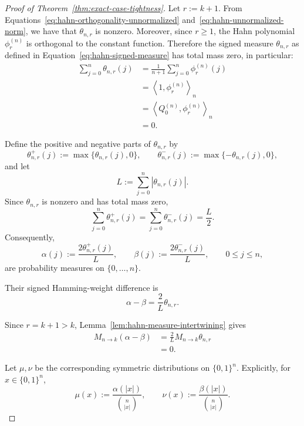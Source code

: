 \documentclass[manuscript,nonacm]{acmart}
\begin{document}
\begin{proof}[Proof of Theorem~\ref{thm:exact-case-tightness}]
Let $r:=k+1$. From Equations~\ref{eq:hahn-orthogonality-unnormalized} and~\ref{eq:hahn-unnormalized-norm}, we have that $\theta_{n,r}$ is nonzero. Moreover, since \(r\ge 1\), the Hahn polynomial \(\phi_r^{(n)}\) is orthogonal to
the constant function. Therefore the signed measure
\(\theta_{n,r}\) as defined in Equation~\ref{eq:hahn-signed-measure} has total mass zero, in particular:
\[
\begin{aligned}
    \sum_{j=0}^n \theta_{n,r}(j)
    &=
    \frac{1}{n+1}
    \sum_{j=0}^n \phi_r^{(n)}(j) \\
    &=
    \left\langle
        1,\phi_r^{(n)}
    \right\rangle_n \\
    &=
    \left\langle
        Q_0^{(n)},\phi_r^{(n)}
    \right\rangle_n \\
    &=0.
\end{aligned}
\]

Define the positive and negative parts of \(\theta_{n,r}\) by
\[
    \theta_{n,r}^{+}(j)
    :=
    \max\{\theta_{n,r}(j),0\},
    \qquad
    \theta_{n,r}^{-}(j)
    :=
    \max\{-\theta_{n,r}(j),0\},
\]
and let
\[
    L
    :=
    \sum_{j=0}^n
    |\theta_{n,r}(j)|.
\]
Since \(\theta_{n,r}\) is nonzero and has total mass zero,
\[
    \sum_{j=0}^n \theta_{n,r}^{+}(j)
    =
    \sum_{j=0}^n \theta_{n,r}^{-}(j)
    =
    \frac{L}{2}.
\]
Consequently,
\[
    \alpha(j)
    :=
    \frac{2\theta_{n,r}^{+}(j)}{L},
    \qquad
    \beta(j)
    :=
    \frac{2\theta_{n,r}^{-}(j)}{L},
    \qquad 0\le j\le n,
\]
are probability measures on \(\{0,\dots,n\}\).


Their signed Hamming-weight difference is
\[
    \alpha-\beta
    =
    \frac{2}{L}\theta_{n,r}.
\]

Since \(r=k+1>k\), Lemma~\ref{lem:hahn-measure-intertwining} gives
\begin{equation}
\label{eq:margAB}
    \begin{aligned}
    M_{n\to k}(\alpha-\beta)
    &=
    \frac{2}{L}
    M_{n\to k}\theta_{n,r} \\
    &=0.
\end{aligned}
\end{equation}


Let \(\mu,\nu\) be the corresponding symmetric distributions on
\(\{0,1\}^n\). Explicitly, for \(x\in\{0,1\}^n\),
\[
    \mu(x)
    :=
    \frac{\alpha(|x|)}{\binom{n}{|x|}},
    \qquad
    \nu(x)
    :=
    \frac{\beta(|x|)}{\binom{n}{|x|}}.
\]


\end{proof}
\end{document}
